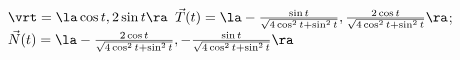 {$\vrt = \la \cos t,2\sin t \ra$
}
{$\vec T(t) = \la -\frac{\sin t}{\sqrt{4\cos^2t+\sin^2t}},\frac{2\cos t}{\sqrt{4\cos^2t+\sin^2t}}\ra$; $\vec N(t) = \la -\frac{2\cos t}{\sqrt{4\cos^2t+\sin^2t}},-\frac{\sin t}{\sqrt{4\cos^2t+\sin^2t}}\ra$
}